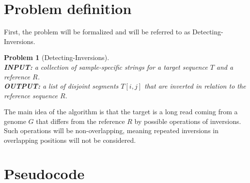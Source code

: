 \newtheorem{theorem}{Theorem}
\newtheorem{problem}{Problem}
\renewcommand\proofname{Proof}

\section{Problem definition}

First, the problem will be formalized and will be referred to as Detecting-Inversions. 

\begin{problem}[Detecting-Inversions]
\noindent \\
{\bf INPUT:} a collection of sample-specific strings for a target sequence $T$ and a reference $R$. \\
{\bf OUTPUT:} a list of disjoint segments $T[i,j]$ that are inverted in relation to the reference sequence $R$. 
\end{problem}

The main idea of the algorithm is that the target is a long read coming from a genome $G$ that differs from the reference $R$ by possible operations of inversions. Such operations will be non-overlapping, meaning repeated inversions in overlapping positions will not be considered. \\ 

\section{Pseudocode}

